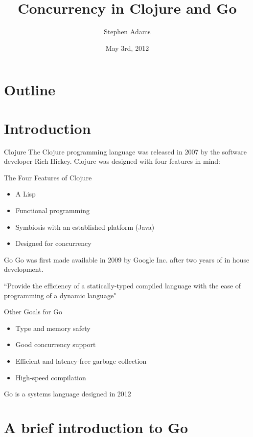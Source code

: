 \documentclass[xcolor=dvipsnames]{beamer}
\title{Concurrency in Clojure and Go}
\author{Stephen Adams}
\date{May 3rd, 2012}
\begin{document}
\begin{frame}
	\titlepage
\end{frame}

\section*{Outline}
	\section{Introduction}
		
	\begin{frame}{Clojure}
		The Clojure programming language was released in 2007 by the software developer Rich Hickey. Clojure was designed with four features in mind:
		\pause
		\begin{block}{The Four Features of Clojure}
		\begin{itemize}
			\item A Lisp
			\item Functional programming
			\item Symbiosis with an established platform (Java)
			\item Designed for concurrency
		\end{itemize}
		\end{block}
	\end{frame}
	
	\begin{frame}{Go}
         	Go was first made available in 2009 by Google Inc. after two years of in house development.
     
         	``Provide the efficiency of a statically-typed compiled language with the ease of programming of a dynamic language"
         	\pause
         	\begin{block}{Other Goals for Go}
         		\begin{itemize}
         			\item Type and memory safety
         			\item Good concurrency support
         			\item Efficient and latency-free garbage collection
         			\item High-speed compilation
         		\end{itemize}
         	\end{block}
         	Go is a systems language designed in 2012
         \end{frame}
         
    \section{A brief introduction to Go}
		
\end{document}
